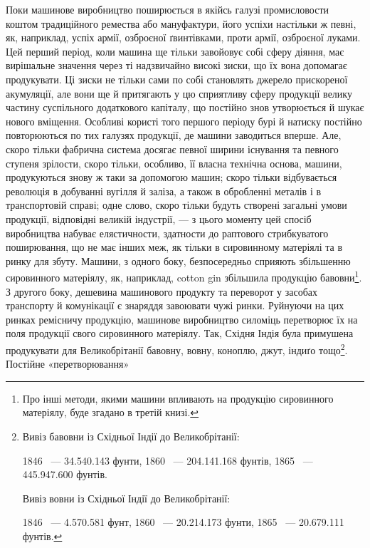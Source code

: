 Поки машинове виробництво поширюється в якійсь галузі промисловости
коштом традиційного ремества або мануфактури, його
успіхи настільки ж певні, як, наприклад, успіх армії, озброєної
ґвинтівками, проти армії, озброєної луками. Цей перший період,
коли машина ще тільки завойовує собі сферу діяння, має вирішальне
значення через ті надзвичайно високі зиски, що їх вона
допомагає продукувати. Ці зиски не тільки сами по собі становлять
джерело прискореної акумуляції, але вони ще й притягають у
цю сприятливу сферу продукції велику частину суспільного додаткового
капіталу, що постійно знов утворюється й шукає нового
вміщення. Особливі користі того першого періоду бурі й натиску
постійно повторюються по тих галузях продукції, де
машини заводиться вперше. Але, скоро тільки фабрична система
досягає певної ширини існування та певного ступеня зрілости,
скоро тільки, особливо, її власна технічна основа, машини, продукуються
знову ж таки за допомогою машин; скоро тільки відбувається
революція в добуванні вугілля й заліза, а також в обробленні
металів і в транспортовій справі; одне слово, скоро тільки
будуть створені загальні умови продукції, відповідні великій
індустрії, — з цього моменту цей спосіб виробництва набуває елястичности,
здатности до раптового стрибкуватого поширювання, що
не має інших меж, як тільки в сировинному матеріялі та в ринку
для збуту. Машини, з одного боку, безпосередньо сприяють збільшенню
сировинного матеріялу, як, наприклад, cotton gin збільшила
продукцію бавовни\footnote{
Про інші методи, якими машини впливають на продукцію сировинного
матеріялу, буде згадано в третій книзі.
}. З другого боку, дешевина машинового
продукту та переворот у засобах транспорту й комунікації є
знаряддя завоювати чужі ринки. Руйнуючи на цих ринках ремісничу
продукцію, машинове виробництво силоміць перетворює
їх на поля продукції свого сировинного матеріялу. Так, Східня
Індія була примушена продукувати для Великобрітанії бавовну,
вовну, коноплю, джут, індиґо тощо\footnote{
\noindent{}Вивіз бавовни із Східньої Індії до Великобрітанії:

\noindent{}1846~ — \num{34.540.143} фунти, 1860~ — \num{204.141.168} фунтів, 1865~ —
\num{445.947.600} фунтів.

\noindent{}Вивіз вовни із Східньої Індії до Великобрітанії:

\noindent{}1846~ — \num{4.570.581} фунт, 1860~ — \num{20.214.173} фунти, 1865~ —
\num{20.679.111} фунтів.
}. Постійне «перетворювання»
